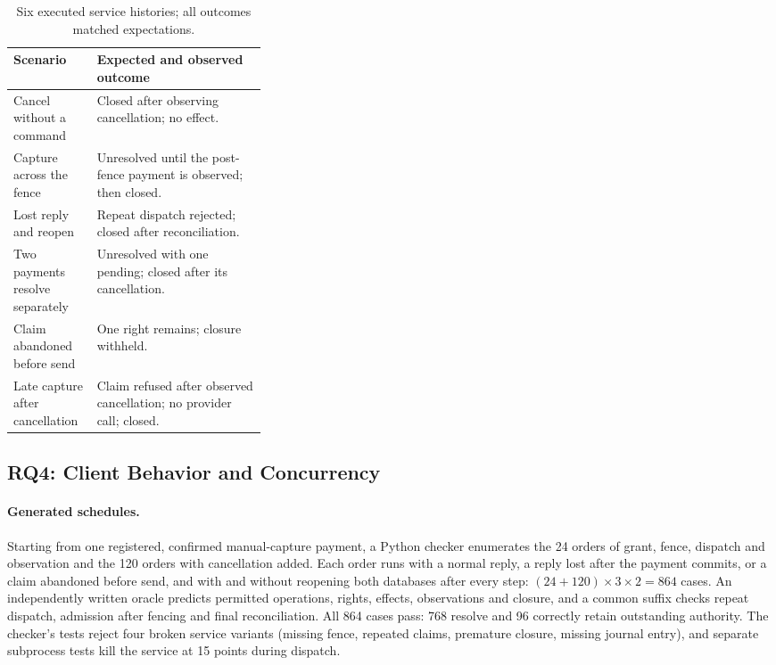 \documentclass[runningheads]{llncs}
\begin{document}
\begin{table}[t]
\centering\small
\caption{Six executed service histories; all outcomes matched expectations.}
\label{tab:service_traces}
\begin{tabularx}{\linewidth}{@{}p{0.33\linewidth} X@{}}
\toprule
Scenario & Expected and observed outcome \\
\midrule
Cancel without a command & Closed after observing cancellation; no effect. \\
Capture across the fence & Unresolved until the post-fence payment is observed; then closed. \\
Lost reply and reopen & Repeat dispatch rejected; closed after reconciliation. \\
Two payments resolve separately & Unresolved with one pending; closed after its cancellation. \\
Claim abandoned before send & One right remains; closure withheld. \\
Late capture after cancellation & Claim refused after observed cancellation; no provider call; closed. \\
\bottomrule
\end{tabularx}
\end{table}

\subsection{RQ4: Client Behavior and Concurrency}
\label{sec:concurrent}
\paragraph{Generated schedules.}
Starting from one registered, confirmed manual-capture payment, a Python
checker enumerates the 24 orders of grant, fence, dispatch and observation and
the 120 orders with cancellation added. Each order runs with a normal reply, a
reply lost after the payment commits, or a claim abandoned before send, and
with and without reopening both databases after every step:
$(24+120)\times3\times2=864$ cases. An independently written oracle predicts
permitted operations, rights, effects, observations and closure, and a common
suffix checks repeat dispatch, admission after fencing and final reconciliation.
All 864 cases pass: 768 resolve and 96 correctly retain outstanding authority.
The checker's tests reject four broken service variants (missing fence,
repeated claims, premature closure, missing journal entry), and separate
subprocess tests kill the service at 15 points during dispatch.
\end{document}
